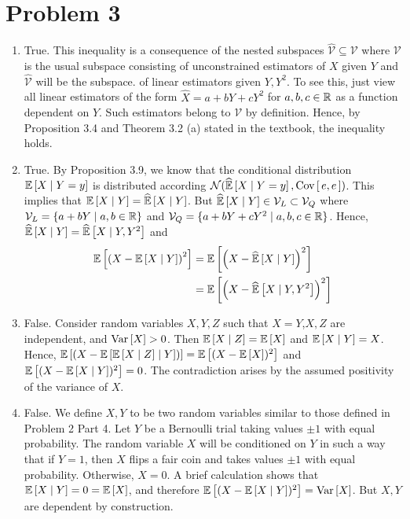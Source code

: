 \documentclass[12pt]{article}%
\begin{document}
\section{Problem 3}
\begin{enumerate}
  \item True. This inequality is a consequence of the nested subspaces $\widehat{\mathcal{V}} \subseteq \mathcal{V}$ where $\mathcal{V}$ is the usual subspace consisting of unconstrained estimators of $X$ given $Y$ and $\widehat{\mathcal{V}}$ will be the subspace. of linear estimators given $Y,Y^2$. To see this, just view all linear estimators of the form $\widehat{X} = a + bY + cY^2$ for $a,b,c \in {\mathbb{R}}$ as a function dependent on $Y$. Such estimators belong to $\mathcal{V}$ by definition. Hence, by Proposition 3.4 and Theorem 3.2 (a) stated in the textbook, the inequality holds.

  \item
  True. By Proposition 3.9, we know that the conditional distribution $\mathbb{E}\left[{X}\mid {Y = y}\right]$ is distributed according $\mathcal{N}(\widehat{ \mathbb{E}}\left[{X} \mid {Y = y}\right],\text{Cov}\left[\,e,e\,\right])$. This implies that $\mathbb{E}\left[{X}\mid {Y}\right] = \widehat{ \mathbb{E}}\left[{X} \mid {Y}\right]$. But $\widehat{ \mathbb{E}}\left[{X} \mid {Y}\right] \in \mathcal{V}_L \subset \mathcal{V}_Q$ where $\mathcal{V}_L = \{a + bY \mid a,b \in {\mathbb{R}} \}$ and $\mathcal{V}_Q = \{a + bY + cY^2 \mid a,b,c \in {\mathbb{R}} \}$. Hence, $\widehat{ \mathbb{E}}\left[{X} \mid {Y}\right] = \widehat{ \mathbb{E}}\left[{X} \mid {Y,Y^2}\right]$ and
  \begin{align*}
  \mathbb{E}\left[\left(X - \mathbb{E}\left[{X}\mid {Y}\right]\right)^2\right] & = \mathbb{E}\left[\left(X - \widehat{ \mathbb{E}}\left[{X} \mid {Y}\right]\right)^2\right] \\
  & = \mathbb{E}\left[\left(X - \widehat{ \mathbb{E}}\left[{X} \mid {Y,Y^2}\right]\right)^2\right]
  \end{align*}

  \item False. Consider random variables $X,Y,Z$ such that $X = Y$,$X,Z$ are independent, and $\text{Var}\left[X\right] > 0$. Then $\mathbb{E}\left[{X}\mid {Z}\right] = \mathbb{E}\left[X\right]$ and $\mathbb{E}\left[{X}\mid {Y}\right] = X$. Hence,
  $\mathbb{E}\left[(X - \mathbb{E}\left[{\mathbb{E}\left[{X}\mid {Z}\right]}\mid {Y}\right])\right] = \mathbb{E}\left[(X - \mathbb{E}\left[X\right])^2\right]$ and $\mathbb{E}\left[(X - \mathbb{E}\left[{X}\mid {Y}\right])^2\right] = 0$. The contradiction arises by the assumed positivity of the variance of $X$.

  \item False. We define $X,Y$ to be two random variables similar to those defined in Problem 2 Part 4. Let $Y$ be a Bernoulli trial taking values $\pm 1$ with equal probability. The random variable $X$ will be conditioned on $Y$ in such a way that if $Y = 1$, then $X$ flips a fair coin and takes values $\pm 1$ with equal probability. Otherwise, $X = 0$.  A brief calculation shows that $\mathbb{E}\left[{X}\mid {Y}\right] = 0 = \mathbb{E}\left[X\right]$, and therefore $\mathbb{E}\left[(X - \mathbb{E}\left[{X}\mid {Y}\right])^2\right] = \text{Var}\left[X\right]$. But $X,Y$ are dependent by construction.

\end{enumerate}
\end{document}
